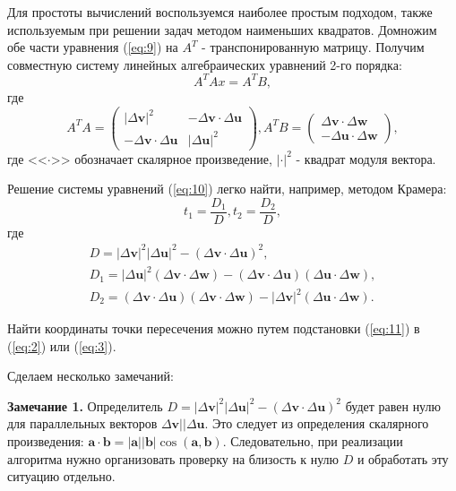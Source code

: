 \documentclass[11pt]{article} %
\begin{document}
Для простоты вычислений воспользуемся наиболее простым подходом, также используемым при решении задач методом наименьших квадратов. Домножим обе части уравнения (\ref{eq:9}) на $A^{T}$ - транспонированную матрицу. Получим совместную систему линейных алгебраических уравнений 2-го порядка:
\begin{equation}
	A^{T}Ax=A^{T}B, \label{eq:10}
\end{equation}  
где 
$$
	A^{T}A = 
	\begin{pmatrix}
		|\Delta \mathbf{v}|^{2} & -\Delta \mathbf{v} \cdot \Delta \mathbf{u}  \\
		-\Delta \mathbf{v} \cdot \Delta \mathbf{u} & |\Delta \mathbf{u}|^{2}			
	\end{pmatrix},
	A^{T}B = 
	\begin{pmatrix}
		\Delta \mathbf{v} \cdot \Delta \mathbf{w}  \\
		-\Delta \mathbf{u} \cdot \Delta \mathbf{w} 
	\end{pmatrix},
$$
где <<$\cdot$>> обозначает скалярное произведение, $|\cdot|^{2}$ - квадрат модуля вектора.

Решение системы уравнений (\ref{eq:10}) легко найти, например, методом Крамера:
\begin{equation}
	t_{1} = \frac{D_{1}}{D}, 	t_{2} = \frac{D_{2}}{D},  \label{eq:11}
\end{equation}
где
\begin{gather*}	
	D = |\Delta \mathbf{v}|^{2}|\Delta \mathbf{u}|^{2} - \left(\Delta \mathbf{v} \cdot \Delta \mathbf{u}\right)^{2}, \\		
	D_{1} = |\Delta \mathbf{u}|^{2}\left(\Delta \mathbf{v} \cdot \Delta \mathbf{w}\right) 
	- \left(\Delta \mathbf{v} \cdot \Delta \mathbf{u}\right)\left(\Delta \mathbf{u} \cdot \Delta \mathbf{w}\right), \\
	D_{2} =  \left(\Delta \mathbf{v} \cdot \Delta \mathbf{u}\right)\left(\Delta \mathbf{v} \cdot \Delta \mathbf{w}\right)
	-|\Delta \mathbf{v}|^{2}\left(\Delta \mathbf{u} \cdot \Delta \mathbf{w}\right).	
\end{gather*}

Найти координаты точки пересечения можно путем подстановки (\ref{eq:11}) в (\ref{eq:2}) или (\ref{eq:3}).

Сделаем несколько замечаний:

\textbf{Замечание 1.} Определитель $D = |\Delta \mathbf{v}|^{2}|\Delta \mathbf{u}|^{2} - \left(\Delta \mathbf{v} \cdot \Delta \mathbf{u}\right)^{2}$ будет равен нулю для параллельных векторов $\Delta \mathbf{v} || \Delta \mathbf{u}$. Это следует из определения скалярного произведения: 
	$\mathbf{a} \cdot \mathbf{b} = |\mathbf{a}||\mathbf{b}|\cos(\mathbf{a}, \mathbf{b})$. Следовательно, при реализации алгоритма нужно организовать проверку на близость к нулю $D$ и обработать эту ситуацию отдельно.  
\end{document}

